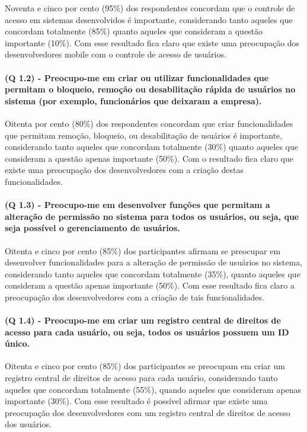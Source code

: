 Noventa e cinco por cento (95{\%}) dos respondentes concordam que o controle de acesso em sistemas desenvolvidos é importante, considerando tanto aqueles que concordam totalmente (85{\%}) quanto aqueles que consideram a questão importante (10{\%}). Com esse resultado fica claro que existe uma preocupação dos desenvolvedores mobile com o controle de acesso de usuários.


\paragraph{\textbf{(Q 1.2)} - Preocupo-me em criar ou utilizar funcionalidades que permitam o bloqueio, remoção ou desabilitação rápida de usuários no sistema (por exemplo, funcionários que deixaram a empresa).}


Oitenta por cento (80{\%}) dos respondentes concordam que criar funcionalidades que permitam remoção, bloqueio, ou desabilitação de usuários é importante, considerando tanto aqueles que concordam totalmente (30{\%}) quanto aqueles que consideram a questão apenas importante (50{\%}). Com o resultado fica claro que existe uma preocupação dos desenvolvedores com a criação destas funcionalidades.

\paragraph{\textbf{(Q 1.3)} - Preocupo-me em desenvolver funções que permitam a alteração de permissão no sistema para todos os usuários, ou seja, que seja possível o gerenciamento de usuários.}


Oitenta e cinco por cento (85{\%}) dos participantes afirmam se preocupar em desenvolver funcionalidades para a alteração de permissão de usuários no sistema, considerando tanto aqueles que concordam totalmente (35{\%}), quanto aqueles que consideram a questão apenas importante (50{\%}). Com esse resultado fica claro a preocupação dos desenvolvedores com a criação de tais funcionalidades.

\paragraph{\textbf{(Q 1.4)} - Preocupo-me em criar um registro central de direitos de acesso para cada usuário, ou seja, todos os usuários possuem um ID único.}


Oitenta e cinco por cento (85{\%}) dos participantes se preocupam em criar um registro central de direitos de acesso para cada usuário, considerando tanto aqueles que concordam totalmente (55{\%}), quando aqueles que consideram apenas importante (30{\%}). Com esse resultado é possível afirmar que existe uma preocupação dos desenvolvedores com um registro central de direitos de acesso dos usuários.


